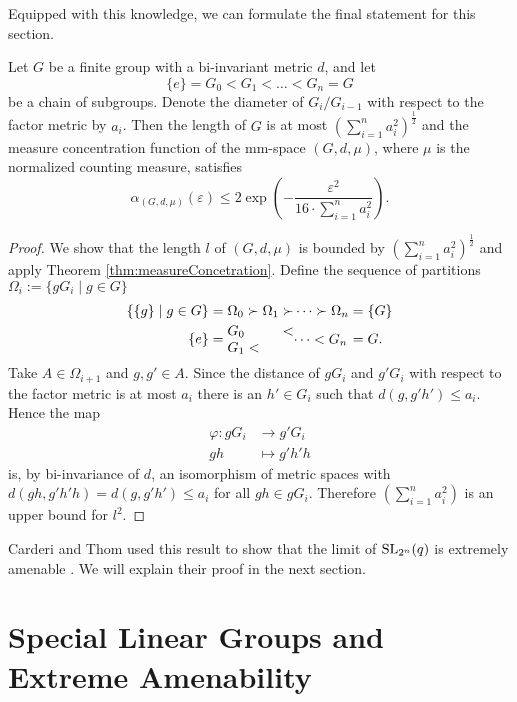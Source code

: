 Equipped with this knowledge, we can formulate the final statement for this section. 
\begin{corollary}\label{cor:meaContractionGroups}
	Let $G$ be a finite group with a bi-invariant metric $d$, and let
	\[\{e\}=G_0<G_1<\dots <G_n=G\]
	be a chain of subgroups. Denote the diameter of $G_i/G_{i-1}$ with respect to the factor metric by $a_i$. Then the length of $G$ is at most $\left(\sum_{i=1}^{n}a_i^2\right)^{\frac{1}{2}}$ and the measure concentration function of the mm-space $(G,d,\mu)$, where $\mu$ is the normalized counting measure, satisfies
	\[\alpha_{(G,d,\mu)}(\varepsilon)\leq 2\exp\left(-\frac{\varepsilon^2}{16\cdot\sum_{i=1}^{n}a_i^2}\right).\]
\end{corollary}
\begin{proof}
	We show that the length $l$ of $(G,d,\mu)$ is bounded by $\left(\sum_{i=1}^{n}a_i^2\right)^{\frac{1}{2}}$ and apply Theorem \ref{thm:measureConcetration}. Define the sequence of partitions $\Omega_i:=\{g G_i\mid g\in G\}$
	\begin{align*}
		\{\{g\}\mid g\in G\}=\Omega_0\succ\Omega_1\succ                   & \dots\succ\Omega_n=\{G\}                                   \\
		\{e\}=\parbox{\widthof{$\Omega_0\succ\Omega_1\succ$}}{$G_0<G_1<$} & \parbox{\widthof{${}\dots\succ\Omega_n$}}{$\dots <G_n$}=G. 
	\end{align*}
	Take $A\in \Omega_{i+1}$ and $g,g'\in A$. Since the distance of $gG_i$ and $g'G_i$ with respect to the factor metric is at most $a_i$ there is an $h'\in G_i$ such that $d(g,g'h')\leq a_i$. Hence the map 
	\begin{align*}
		\varphi\colon g G_i & {}\to g'G_i     \\
		gh               & {}\mapsto g'h'h 
	\end{align*}
	is, by bi-invariance of $d$, an isomorphism of metric spaces with $d(gh,g'h'h)=d(g,g'h')\leq a_i$ for all $gh\in gG_i$.
	Therefore $\left(\sum_{i=1}^{n}a_i^2\right)$ is an upper bound for $l^2$. 
\end{proof}
Carderi and Thom used this result to show that the limit of $\operatorname{SL}_{2^n}(q)$ is extremely amenable \cite{thom}. We will explain their proof in the next section. 
		
		
\section{Special Linear Groups and Extreme Amenability}\label{sec:thom}
		
